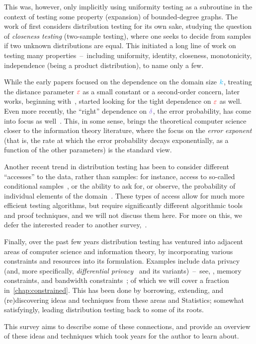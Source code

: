 This was, however, only implicitly using uniformity testing as a subroutine in the context of testing some property (expansion) of bounded-degree graphs. The work of \citet{BatuFRSW00} first considers distribution testing for its own sake, studying the question of \emph{closeness testing} (\ie two-sample testing), where one seeks to decide from samples if two unknown distributions are equal. This initiated a long line of work on testing many properties~--~including uniformity, identity, closeness, monotonicity, independence (being a product distribution), to name only a few.

While the early papers focused on the dependence on the domain size ${\textcolor{cyan}{k}}$, treating the distance parameter $\textcolor{red}{\varepsilon}$ as a small constant or a second-order concern, later works, beginning with~\citet{ChanDVV14}, started looking for the tight dependence on $\textcolor{red}{\varepsilon}$ as well. Even more recently, the ``right'' dependence on $\errprob$, the error probability, has come into focus as well~\citep{DiakonikolasGPP18,DiakonikolasGKP21}. This, in some sense, brings the theoretical computer science closer to the information theory literature, where the focus on the \emph{error exponent} (that is, the rate at which the error probability decays exponentially, as a function of the other parameters) is the standard view.

Another recent trend in distribution testing has been to consider different ``accesses'' to the data, rather than \iid samples: for instance, access to so-called conditional samples~\citep{CRS:15,CFGM:13}, or the ability to ask for, or observe, the probability of individual elements of the domain~\citep{RubinfeldS09,CanonneR14,OnakS18}. These types of access allow for much more efficient testing algorithms, but require significantly different algorithmic tools and proof techniques, and we will not discuss them here. For more on this, we defer the interested reader to another survey,~\citet{Canonne:15:Survey}.

Finally, over the past few years distribution testing has ventured into adjacent areas of computer science and information theory, by incorporating various constraints and resources into its formulation. Examples include data privacy (and, more specifically, \emph{differential privacy}~\citep{DworkMNS06} and its variants)~--~see, \eg \citep{KamathU20}, memory constraints, and bandwidth constraints~\citep{Tsitsiklis:93}; of which we will cover a fraction in~\cref{chap:constrained}. This has been done by borrowing, extending, and (re)discovering ideas and techniques from these areas and Statistics; somewhat satisfyingly, leading distribution testing back to some of its roots. 

This survey aims to describe some of these connections, and provide an overview of these ideas and techniques which took years for the author to learn about.
